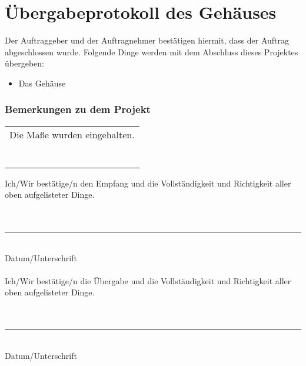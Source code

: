 \section[Übergabeprotokoll, Teilauftrag Gehäuse]{Übergabeprotokoll des Gehäuses}
\bigskip
Der Auftraggeber und der Auftragnehmer bestätigen hiermit, dass der Auftrag abgeschlossen wurde. Folgende Dinge werden mit dem Abschluss dieses Projektes übergeben:
\begin{itemize}
\item Das Gehäuse
\end{itemize}
\bigskip
\subsubsection*{Bemerkungen zu dem Projekt}

\begin{tabular}{|p{\textwidth}|}
\hline
Die Maße wurden eingehalten.\\
\bigskip \\
\bigskip \\
~\\
\hline
\end{tabular}

\bigskip
\bigskip
Ich/Wir bestätige/n den Empfang und die Vollständigkeit und Richtigkeit aller oben aufgelisteter Dinge.\\
\bigskip \\
\bigskip \\
\rule{5cm}{0.5mm}\\
Datum/Unterschrift\\
\bigskip \\
Ich/Wir bestätige/n die Übergabe und die Vollständigkeit und Richtigkeit aller oben aufgelisteter Dinge.\\
\bigskip \\
\bigskip \\
\rule{5cm}{0.5mm}~\\
Datum/Unterschrift
